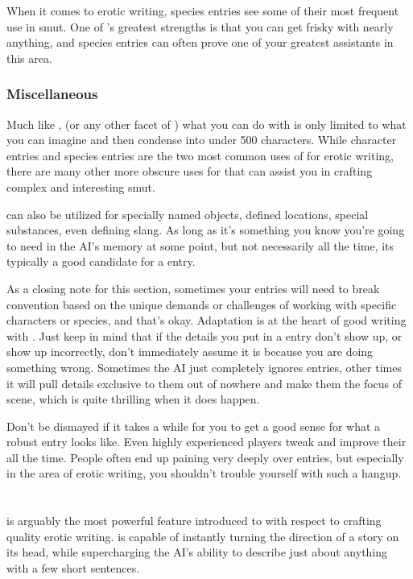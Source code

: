 ﻿\documentclass[Coomer-main.tex]{subfiles}
\begin{document}
When it comes to erotic writing, species entries see some of their most frequent use in smut.
One of \aid's greatest strengths is that you can get frisky with nearly anything, and species entries can often prove one of your greatest assistants in this area.

\subsection{Miscellaneous}

Much like \an, (or any other facet of \aid) what you can do with \wi is only limited to what you can imagine and then condense into under 500 characters.
While character entries and species entries are the two most common uses of \wi for erotic writing, there are many other more obscure uses for \wi that can assist you in crafting complex and interesting smut.

\wi can also be utilized for specially named objects, defined locations, special substances, even defining slang.
As long as it's something you know you're going to need in the AI's memory at some point, but not necessarily all the time, its typically a good candidate for a \wi entry.

As a closing note for this section, sometimes your \wi entries will need to break convention based on the unique demands or challenges of working with specific characters or species, and that's okay.
Adaptation is at the heart of good writing with \aid.
Just keep in mind that if the details you put in a \wi entry don't show up, or show up incorrectly, don't immediately assume it is because you are doing something wrong.
Sometimes the AI just completely ignores entries, other times it will pull details exclusive to them out of nowhere and make them the focus of scene, which is quite thrilling when it does happen.

Don't be dismayed if it takes a while for you to get a good sense for what a robust \wi entry looks like.
Even highly experienced players tweak and improve their \wi all the time.
People often end up paining very deeply over \wi entries, but especially in the area of erotic writing, you shouldn't trouble yourself with such a hangup.

\chapter{\ans}
\label{ch:ans}

\an is arguably the most powerful feature introduced to \aid with respect to crafting quality erotic writing. \an is capable of instantly turning the direction of a story on its head, while supercharging the AI's ability to describe just about anything with a few short sentences.
\end{document}

